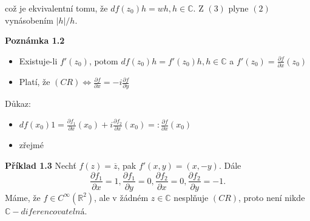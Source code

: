 \documentclass[11pt, a4paper, onecolumn]{article}
\begin{document}
což je ekvivalentní tomu, že $df(z_0)h=wh, h\in \mathbb{C}$. Z $(3)$ plyne $(2)$ vynásobením $|h|/h$.

\begin{flushright}\qedsymbol\end{flushright}


\textbf{Poznámka 1.2}
\begin{itemize}
    \item Existuje-li $f'(z_0)$, potom $df(z_0)h = f'(z_0)h, h \in \mathbb{C}$ a $f'(z_0) = \frac{\partial f}{\partial x}(z_0)$
    \item Platí, že $(CR) \iff \frac{\partial f}{\partial x} = -i\frac{\partial f}{\partial y}$
\end{itemize}

Důkaz:
\begin{itemize}
    \item $df(x_0)1 = \frac{\partial f_1}{\partial x}(x_0) + i\frac{\partial f_2}{\partial x}(x_0) =: \frac{\partial f}{\partial x}(x_0)$
    \item zřejmé
\end{itemize}

\textbf{Příklad 1.3}
Nechť $f(z) = \overline{z}$, pak $f'(x,y) = (x,-y)$. Dále 
$$\frac{\partial f_1}{\partial x} = 1, \frac{\partial f_1}{\partial y} = 0, \frac{\partial f_2}{\partial x} = 0, \frac{\partial f_2}{\partial y} = -1.$$
Máme, že $f\in C^\infty(\mathbb{R}^2)$, ale v žádném $z\in \mathbb{C}$ nesplňuje $(CR)$, proto není nikde $\mathbb{C}-diferencovatelná$.

\end{document}
